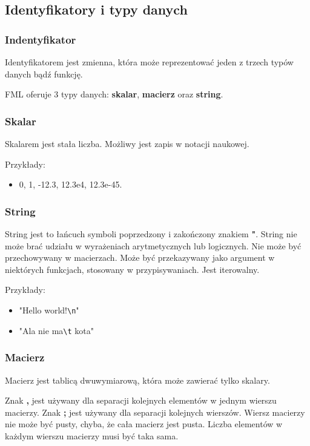 \documentclass[12pt,a4paper]{article}
\begin{document}
%
%
\subsection{Identyfikatory i typy danych}

\subsubsection{Indentyfikator}

Identyfikatorem jest zmienna, która może reprezentować jeden z trzech typów danych bądź funkcję.

FML oferuje 3 typy danych: \textbf{skalar}, \textbf{macierz} oraz \textbf{string}.

\subsubsection{Skalar}

Skalarem jest stała liczba. Możliwy jest zapis w notacji naukowej.

Przykłady:
\begin{itemize}
\item 0, 1, -12.3, 12.3e4, 12.3e-45.
\end{itemize}

\subsubsection{String}
String jest to łańcuch symboli poprzedzony i zakończony znakiem \textbf{"}. 
String nie może brać udziału w wyrażeniach arytmetycznych lub logicznych. Nie może być przechowywany w macierzach. Może być przekazywany jako argument w niektórych funkcjach, stosowany w przypisywaniach. Jest iterowalny.

\medskip
Przykłady:
\begin{itemize}

\item "Hello world!\verb+\n+"

\item "Ala nie ma\verb+\t+ kota"
\end{itemize}

\subsubsection{Macierz}
Macierz jest tablicą dwuwymiarową, która może zawierać tylko skalary.

Znak \textbf{,} jest używany dla separacji kolejnych elementów w jednym wierszu macierzy. Znak \textbf{;} jest używany dla separacji kolejnych wierszów. Wiersz macierzy nie może być pusty, chyba, że cała macierz jest pusta. Liczba elementów w każdym wierszu macierzy musi być taka sama.
\end{document}
